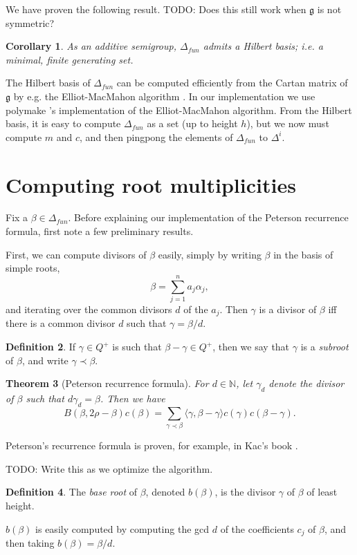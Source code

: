 \documentclass[12pt]{report}
\newcommand{\NN}{\mathbb{N}}
\newcommand{\g}{\mathfrak g}
\newcommand{\dfn}[1]{\emph{#1}\index{#1}}
\newtheorem{theorem}{Theorem}[chapter]
\newtheorem{corollary}[theorem]{Corollary}
\theoremstyle{definition}
\newtheorem{definition}[theorem]{Definition}
\begin{document}
We have proven the following result. TODO: Does this still work when $\g$ is not symmetric?
\begin{corollary}
	As an additive semigroup, $\Delta_{fun}$ admits a \dfn{Hilbert basis}; i.e. a minimal, finite generating set.
\end{corollary}
The Hilbert basis of $\Delta_{fun}$ can be computed efficiently from the Cartan matrix of $\g$ by e.g. the Elliot-MacMahon algorithm \cite{pasechnik2001computing}. In our implementation we use polymake \cite{polymake2000}'s implementation of the Elliot-MacMahon algorithm. From the Hilbert basis, it is easy to compute $\Delta_{fun}$ as a set (up to height $h$), but we now must compute $m$ and $c$, and then pingpong the elements of $\Delta_{fun}$ to $\Delta^i$.

\section{Computing root multiplicities}
Fix a $\beta \in \Delta_{fun}$. Before explaining our implementation of the Peterson recurrence formula, first note a few preliminary results.

First, we can compute divisors of $\beta$ easily, simply by writing $\beta$ in the basis of simple roots,
	$$\beta = \sum_{j=1}^n a_j \alpha_j,$$
	and iterating over the common divisors $d$ of the $a_j$. Then $\gamma$ is a divisor of $\beta$ iff there is a common divisor $d$ such that $\gamma = \beta/d$.

\begin{definition}
	If $\gamma \in Q^+$ is such that $\beta - \gamma \in Q^+$, then we say that $\gamma$ is a \dfn{subroot} of $\beta$, and write $\gamma \prec \beta$.
\end{definition}

\begin{theorem}[Peterson recurrence formula]
	For $d \in \NN$, let $\gamma_d$ denote the divisor of $\beta$ such that $d\gamma_d = \beta$. Then we have
	$$B(\beta, 2\rho - \beta) c(\beta) = \sum_{\gamma \prec \beta} \langle \gamma, \beta - \gamma \rangle c(\gamma) c(\beta - \gamma).$$
\end{theorem}
Peterson's recurrence formula is proven, for example, in Kac's book \cite{kac_2014}.

TODO: Write this as we optimize the algorithm.
\begin{definition}
	The \dfn{base root} of $\beta$, denoted $b(\beta)$, is the divisor $\gamma$ of $\beta$ of least height.
\end{definition}
	$b(\beta)$ is easily computed by computing the gcd $d$ of the coefficients $c_j$ of $\beta$, and then taking $b(\beta) = \beta/d$.
\end{document}
